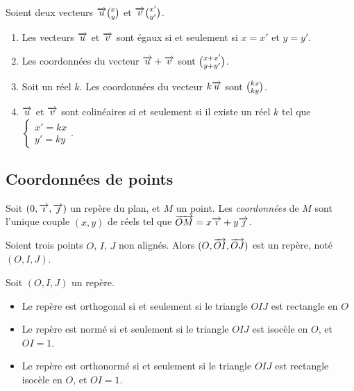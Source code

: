 \begin{propriete} Soient deux vecteurs $\overrightarrow{u}\binom{x}{y}$ et $\overrightarrow{v}\binom{x'}{y'}$.
  \begin{enumerate}
  \item Les vecteurs $\overrightarrow{u}$ et $\overrightarrow{v}$ sont égaux si et seulement si $x=x'$ et $y=y'$.
  \item Les coordonnées du vecteur $\overrightarrow{u}+\overrightarrow{v}$ sont $\binom{x+x'}{y+y'}$.
  \item Soit un réel $k$. Les coordonnées du vecteur $k\overrightarrow{u}$ sont $\binom{kx}{ky}$.
\item $\overrightarrow{u}$ et $\overrightarrow{v}$ sont colinéaires si et seulement si il existe un réel $k$ tel que $\left\{\begin{array}{l}x'=kx\\y'=ky\end{array}\right.$.
\end{enumerate}
\end{propriete}

\subsection{Coordonnées de points}

\begin{definition}
  Soit $(0, \overrightarrow{\imath}, \overrightarrow{\jmath})$ un repère du plan, et $M$ un point. Les \emph{coordonnées} de $M$ sont l'unique couple $(x,y)$ de réels tel que $\overrightarrow{OM}=x\overrightarrow{\imath}+y\overrightarrow{\jmath}$.
\end{definition}

\begin{definition}
  Soient trois points $O$, $I$, $J$ non alignés. Alors $(O, \overrightarrow{OI}, \overrightarrow{OJ})$ est un repère, noté $(O, I, J)$.
\end{definition}

\begin{propriete}
  Soit $(O,I,J)$ un repère.
  \begin{itemize}
    \item Le repère est orthogonal si et seulement si le triangle $OIJ$ est rectangle en $O$ 
    \item Le repère est normé si et seulement si le triangle $OIJ$ est isocèle en $O$, et $OI=1$.
    \item Le repère est orthonormé si et seulement si le triangle $OIJ$ est rectangle isocèle en $O$, et $OI=1$.
  \end{itemize}
\end{propriete}

